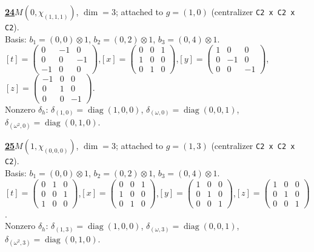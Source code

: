 \begin{samepage}\noindent\textbf{\underline{24}}\quad $M(0,\chi_{(1,1,1)})$, $\dim=3$; attached to $g=(1,0)$ (centralizer \texttt{C2 x C2 x C2}).\\
Basis: $b_{1}=(0,0)\otimes 1$, $b_{2}=(0,2)\otimes 1$, $b_{3}=(0,4)\otimes 1$.\\
$[t]=\left(\begin{smallmatrix} 0 & -1 & 0 \\ 0 & 0 & -1 \\ -1 & 0 & 0 \end{smallmatrix}\right)$,\quad $[x]=\left(\begin{smallmatrix} 0 & 0 & 1 \\ 1 & 0 & 0 \\ 0 & 1 & 0 \end{smallmatrix}\right)$,\quad $[y]=\left(\begin{smallmatrix} 1 & 0 & 0 \\ 0 & -1 & 0 \\ 0 & 0 & -1 \end{smallmatrix}\right)$,\quad $[z]=\left(\begin{smallmatrix} -1 & 0 & 0 \\ 0 & 1 & 0 \\ 0 & 0 & -1 \end{smallmatrix}\right)$.\\
Nonzero $\delta_h$: $\delta_{(1,0)}=\operatorname{diag}(1,0,0)$, $\delta_{(\omega,0)}=\operatorname{diag}(0,0,1)$, $\delta_{(\omega^2,0)}=\operatorname{diag}(0,1,0)$.\end{samepage}
\medskip

\begin{samepage}\noindent\textbf{\underline{25}}\quad $M(1,\chi_{(0,0,0)})$, $\dim=3$; attached to $g=(1,3)$ (centralizer \texttt{C2 x C2 x C2}).\\
Basis: $b_{1}=(0,0)\otimes 1$, $b_{2}=(0,2)\otimes 1$, $b_{3}=(0,4)\otimes 1$.\\
$[t]=\left(\begin{smallmatrix} 0 & 1 & 0 \\ 0 & 0 & 1 \\ 1 & 0 & 0 \end{smallmatrix}\right)$,\quad $[x]=\left(\begin{smallmatrix} 0 & 0 & 1 \\ 1 & 0 & 0 \\ 0 & 1 & 0 \end{smallmatrix}\right)$,\quad $[y]=\left(\begin{smallmatrix} 1 & 0 & 0 \\ 0 & 1 & 0 \\ 0 & 0 & 1 \end{smallmatrix}\right)$,\quad $[z]=\left(\begin{smallmatrix} 1 & 0 & 0 \\ 0 & 1 & 0 \\ 0 & 0 & 1 \end{smallmatrix}\right)$.\\
Nonzero $\delta_h$: $\delta_{(1,3)}=\operatorname{diag}(1,0,0)$, $\delta_{(\omega,3)}=\operatorname{diag}(0,0,1)$, $\delta_{(\omega^2,3)}=\operatorname{diag}(0,1,0)$.\end{samepage}
\medskip

